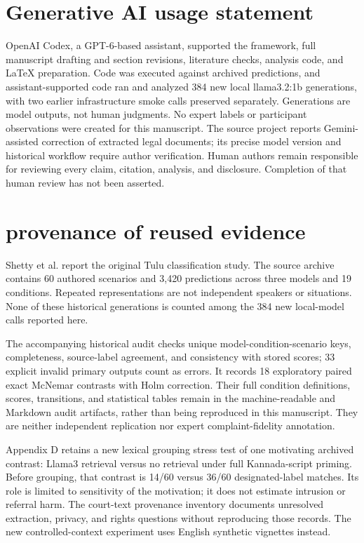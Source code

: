 \documentclass[manuscript,screen,review,anonymous]{acmart}
\begin{document}
\section*{Generative AI usage statement}

OpenAI Codex, a GPT-6-based assistant, supported the framework, full manuscript drafting and section revisions, literature checks, analysis code, and LaTeX preparation. Code was executed against archived predictions, and assistant-supported code ran and analyzed 384 new local llama3.2:1b generations, with two earlier infrastructure smoke calls preserved separately. Generations are model outputs, not human judgments. No expert labels or participant observations were created for this manuscript. The source project reports Gemini-assisted correction of extracted legal documents; its precise model version and historical workflow require author verification. Human authors remain responsible for reviewing every claim, citation, analysis, and disclosure. Completion of that human review has not been asserted.

\clearpage



\clearpage
\appendix
\section{provenance of reused evidence}

Shetty et al. \cite{prior} report the original Tulu classification study. The source archive contains 60 authored scenarios and 3,420 predictions across three models and 19 conditions. Repeated representations are not independent speakers or situations. None of these historical generations is counted among the 384 new local-model calls reported here.

The accompanying historical audit checks unique model-condition-scenario keys, completeness, source-label agreement, and consistency with stored scores; 33 explicit invalid primary outputs count as errors. It records 18 exploratory paired exact McNemar contrasts with Holm correction. Their full condition definitions, scores, transitions, and statistical tables remain in the machine-readable and Markdown audit artifacts, rather than being reproduced in this manuscript. They are neither independent replication nor expert complaint-fidelity annotation.

Appendix D retains a new lexical grouping stress test of one motivating archived contrast: Llama3 retrieval versus no retrieval under full Kannada-script priming. Before grouping, that contrast is 14/60 versus 36/60 designated-label matches. Its role is limited to sensitivity of the motivation; it does not estimate intrusion or referral harm. The court-text provenance inventory documents unresolved extraction, privacy, and rights questions without reproducing those records. The new controlled-context experiment uses English synthetic vignettes instead.
\end{document}
